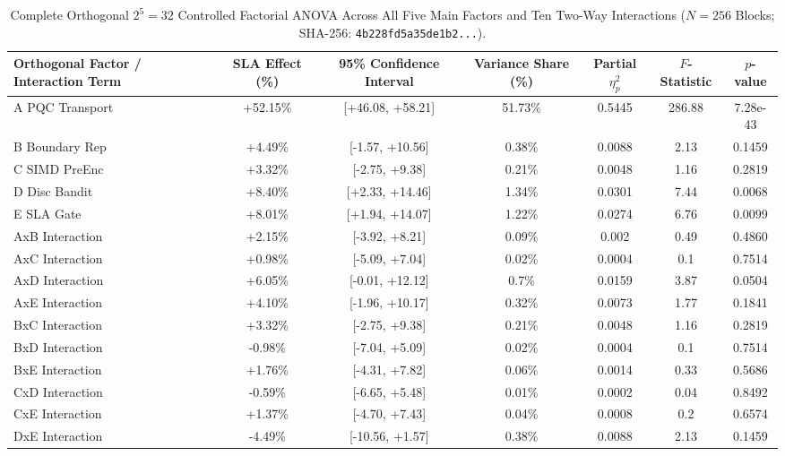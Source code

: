 \documentclass[10pt,journal,compsoc]{IEEEtran}
\begin{document}
\begin{table}[!htbp]\centering\scriptsize
\caption{Complete Orthogonal $2^5=32$ Controlled Factorial ANOVA Across All Five Main Factors and Ten Two-Way Interactions ($N=256$ Blocks; SHA-256: \texttt{4b228fd5a35de1b2...}).}
\begin{tabular}{@{}lcccccc@{}}\toprule
\textbf{Orthogonal Factor / Interaction Term} & \textbf{SLA Effect (\%)} & \textbf{95\% Confidence Interval} & \textbf{Variance Share (\%)} & \textbf{Partial $\eta_p^2$} & \textbf{$F$-Statistic} & \textbf{$p$-value} \\\midrule
A PQC Transport & +52.15\% & [+46.08, +58.21] & 51.73\% & 0.5445 & 286.88 & 7.28e-43 \\
B Boundary Rep & +4.49\% & [-1.57, +10.56] & 0.38\% & 0.0088 & 2.13 & 0.1459 \\
C SIMD PreEnc & +3.32\% & [-2.75, +9.38] & 0.21\% & 0.0048 & 1.16 & 0.2819 \\
D Disc Bandit & +8.40\% & [+2.33, +14.46] & 1.34\% & 0.0301 & 7.44 & 0.0068 \\
E SLA Gate & +8.01\% & [+1.94, +14.07] & 1.22\% & 0.0274 & 6.76 & 0.0099 \\
AxB Interaction & +2.15\% & [-3.92, +8.21] & 0.09\% & 0.002 & 0.49 & 0.4860 \\
AxC Interaction & +0.98\% & [-5.09, +7.04] & 0.02\% & 0.0004 & 0.1 & 0.7514 \\
AxD Interaction & +6.05\% & [-0.01, +12.12] & 0.7\% & 0.0159 & 3.87 & 0.0504 \\
AxE Interaction & +4.10\% & [-1.96, +10.17] & 0.32\% & 0.0073 & 1.77 & 0.1841 \\
BxC Interaction & +3.32\% & [-2.75, +9.38] & 0.21\% & 0.0048 & 1.16 & 0.2819 \\
BxD Interaction & -0.98\% & [-7.04, +5.09] & 0.02\% & 0.0004 & 0.1 & 0.7514 \\
BxE Interaction & +1.76\% & [-4.31, +7.82] & 0.06\% & 0.0014 & 0.33 & 0.5686 \\
CxD Interaction & -0.59\% & [-6.65, +5.48] & 0.01\% & 0.0002 & 0.04 & 0.8492 \\
CxE Interaction & +1.37\% & [-4.70, +7.43] & 0.04\% & 0.0008 & 0.2 & 0.6574 \\
DxE Interaction & -4.49\% & [-10.56, +1.57] & 0.38\% & 0.0088 & 2.13 & 0.1459 \\
\bottomrule\end{tabular}\end{table}
\end{document}
